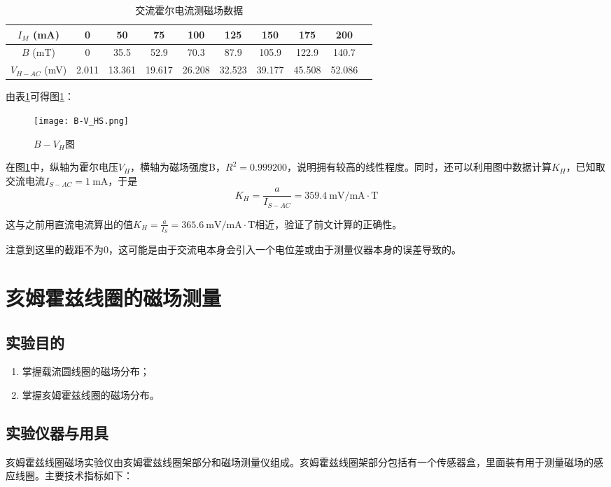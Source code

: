 \documentclass[11pt]{article}
\begin{document}
	\begin{table}[H]\centering
		\caption{交流霍尔电流测磁场数据}
		\label{交流霍尔电流测磁场数据}
		\begin{tabular}{cccccccccc}\toprule
			$I_M$ (mA) &0  &50	    &75	    &100	&125	&150	&175	&200    \\
			\midrule
			$B$ (mT) &0 & 35.5	&52.9	&70.3	&87.9	&105.9	&122.9	&140.7  \\
			$V_{H-AC}$ (mV) &2.011 & 13.361	&19.617	&26.208	&32.523	&39.177	&45.508	&52.086 \\
			\bottomrule
		\end{tabular}
	\end{table}
	
	由表\ref{交流霍尔电流测磁场数据}可得图\ref{fig:B-V_HS}：
	\begin{figure}[H]
		\centering
		\texttt{[image: B-V\_HS.png]}
		\caption{$B-V_H$图}
		\label{fig:B-V_HS}
	\end{figure}
	在图\ref{fig:B-V_HS}中，纵轴为霍尔电压$V_H$，横轴为磁场强度B，$R^2=0.999200$，说明拥有较高的线性程度。同时，还可以利用图中数据计算$K_H$，已知取交流电流$I_{S-AC}=1 \ \mathrm{mA}$，于是
	\[K_H=\frac{a}{I_{S-AC}}=359.4 \ \mathrm{mV/mA \cdot T}\]
	
	这与之前用直流电流算出的值$K_H=\frac{a}{I_S}=365.6 \ \mathrm{mV/mA \cdot T}$相近，验证了前文计算的正确性。
	
	注意到这里的截距不为0，这可能是由于交流电本身会引入一个电位差或由于测量仪器本身的误差导致的。
	
	
	
	\section{亥姆霍兹线圈的磁场测量}
	
	\subsection{实验目的}
	\begin{enumerate}
		\item 掌握载流圆线圈的磁场分布；
		\item 掌握亥姆霍兹线圈的磁场分布。
	\end{enumerate}
	
	
	\subsection{实验仪器与用具}
	亥姆霍兹线圈磁场实验仪由亥姆霍兹线圈架部分和磁场测量仪组成。亥姆霍兹线圈架部分包括有一个传感器盒，里面装有用于测量磁场的感应线圈。主要技术指标如下：
	
\end{document}
